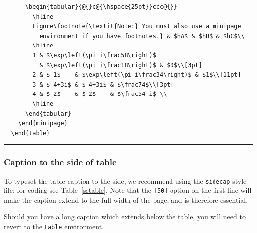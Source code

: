 \begin{table}
\begin{verbatim}
      \begin{tabular}{@{}c@{\hspace{25pt}}ccc@{}}
        \hline
        Figure\footnote{\textit{Note:} You must also use a minipage
          environment if you have footnotes.} & $hA$ & $hB$ & $hC$\\
        \hline
        1 & $\exp\left(\pi i\frac58\right)$
          & $\exp\left(\pi i\frac18\right)$ & $0$\\[3pt]
        2 & $-1$    & $\exp\left(\pi i\frac34\right)$ & $1$\\[11pt]
        3 & $-4+3i$ & $-4+3i$ & $\frac74$\\[3pt]
        4 & $-2$    & $-2$    & $\frac54 i$ \\
        \hline
      \end{tabular}
    \end{minipage}
  \end{table}
\end{verbatim}
\rule[20pt]{\textwidth}{0.5pt}
  \end{table}


\subsubsection{Caption to the side of table}

To typeset the table caption to the side, we recommend using the \verb"sidecap" style file; for coding see Table~\ref{sctable}. Note that the \verb"[50]" option on the first line will make the caption extend to the full width of the page, and is therefore essential.

Should you have a long caption which extends below the table, you will need to revert to the \verb"table" environment.

